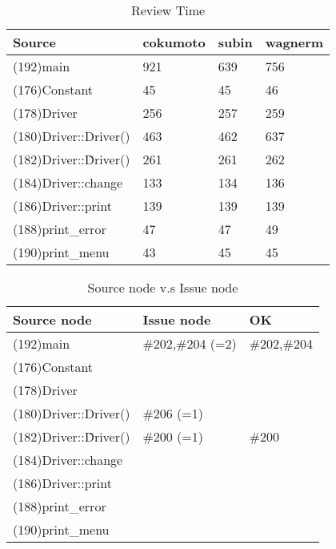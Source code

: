 \begin{table}[hb]
\begin{center}
\begin{tabular}{|l|l|l|l|}
\hline
Source & cokumoto & subin & wagnerm\\
\hline
(192)main & 921 & 639 & 756\\
(176)Constant & 45 & 45 & 46\\
(178)Driver & 256 & 257 & 259\\
(180)Driver::Driver() & 463 & 462 & 637\\
(182)Driver::\~Driver() & 261 & 261 & 262\\
(184)Driver::change & 133 & 134 & 136\\
(186)Driver::print & 139 & 139 & 139\\
(188)print\_error & 47 & 47 & 49\\
(190)print\_menu & 43 & 45 & 45\\
\hline
\end{tabular}
\end{center}
\caption{Review Time}
\end{table}


\begin{table}[hb]
\begin{center}
\begin{tabular}{|l|l|l|}
\hline
Source node & Issue node  & OK\\
\hline
(192)main & \#202,\#204 (=2) & \#202,\#204\\
(176)Constant & &\\
(178)Driver & &\\
(180)Driver::Driver() & \#206 (=1) &\\
(182)Driver::\~Driver() & \#200 (=1) & \#200\\
(184)Driver::change & &\\
(186)Driver::print & &\\
(188)print\_error & &\\
(190)print\_menu & &\\
\hline
\end{tabular}
\caption{Source node v.s Issue node}
\end{center}
\end{table}

